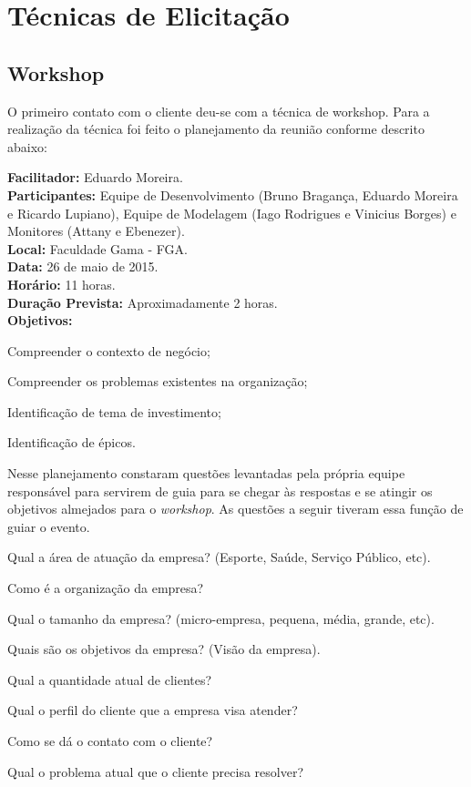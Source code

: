 \section{Técnicas de Elicitação}
	\subsection{Workshop}
		O primeiro contato com o cliente deu-se com a técnica de workshop. Para a realização da técnica foi feito o planejamento da reunião conforme descrito abaixo:

		\textbf{Facilitador: }Eduardo Moreira.\\
		\textbf{Participantes: }Equipe de Desenvolvimento (Bruno Bragança, Eduardo Moreira e Ricardo Lupiano), Equipe de Modelagem (Iago Rodrigues e Vinicius Borges) e Monitores (Attany e Ebenezer).\\
		\textbf{Local: }Faculdade Gama - FGA.\\
		\textbf{Data: }26 de maio de 2015.\\
		\textbf{Horário: }11 horas.\\
		\textbf{Duração Prevista: }Aproximadamente 2 horas.\\
		\textbf{Objetivos:}\\
		\begin{itemize}
		{
			\item Compreender o contexto de negócio;
			\item Compreender os problemas existentes na organização;
			\item Identificação de tema de investimento;
			\item Identificação de épicos.
		}
		\end{itemize}

		Nesse planejamento constaram questões levantadas pela própria equipe responsável para servirem de guia para se chegar às respostas e se atingir os objetivos almejados para o \textit{workshop}. As questões a seguir tiveram essa função de guiar o evento.

		\begin{itemize}
		{
			\item Qual a área de atuação da empresa? (Esporte, Saúde, Serviço Público, etc).
			\item Como é a organização da empresa?
			\item Qual o tamanho da empresa? (micro-empresa, pequena, média, grande, etc).
			\item Quais são os objetivos da empresa? (Visão da empresa).
			\item Qual a quantidade atual de clientes?
			\item Qual o perfil do cliente que a empresa visa atender?
			\item Como se dá o contato com o cliente?
			\item Qual o problema atual que o cliente precisa resolver?
		}
		\end{itemize}

